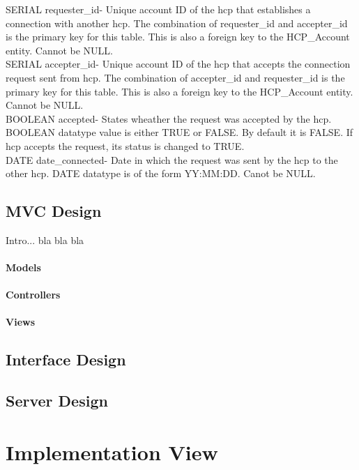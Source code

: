\documentclass[12pt]{report}
\begin{document}
SERIAL requester_id- Unique account ID of the hcp that establishes a connection with another hcp.  The combination of requester_id and accepter_id is the primary key for this table.  This is also a foreign key to the HCP_Account entity.  Cannot be NULL.\\  

SERIAL accepter_id- Unique account ID of the hcp that accepts the connection request sent from hcp.  The combination of accepter_id and requester_id is the primary key for this table.  This is also a foreign key to the HCP_Account entity.  Cannot be NULL.\\

BOOLEAN accepted- States wheather the request was accepted by the hcp.  BOOLEAN datatype value is either TRUE or FALSE.  By default it is FALSE.  If hcp accepts the request, its status is changed to TRUE.\\

DATE date_connected- Date in which the request was sent by the hcp to the other hcp.  DATE datatype is of the form YY:MM:DD.  Canot be NULL.\\



\subsection{MVC Design}

Intro... bla bla bla
\paragraph{Models}
\paragraph{Controllers}
\paragraph{Views}

\subsection{Interface Design}
\subsection{Server Design}

\section{Implementation View}
\end{document}
